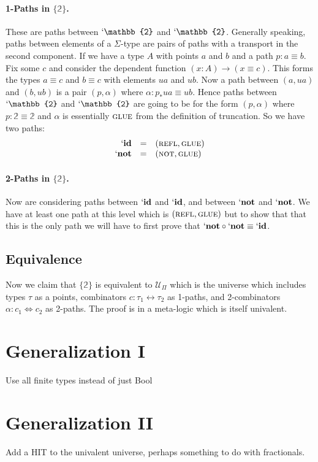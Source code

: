 \documentclass{entcs}
\newcommand{\reflp}{\textsc{refl}}
\newcommand{\notp}{\textsc{not}}
\newcommand{\gluep}{\textsc{glue}}
\newcommand{\iso}{\leftrightarrow}
\newcommand{\isotwo}{\Leftrightarrow}
\newcommand{\bt}{\mathbb{2}}
\begin{document}
\paragraph*{1-Paths in $\{\bt\}$.} These are paths between $`\bt$ and
$`\bt$. Generally speaking, paths between elements of a $\Sigma$-type are pairs
of paths with a transport in the second component. If we have a type $A$ with
points $a$ and $b$ and a path $p : a \equiv b$. Fix some $c$ and consider the
dependent function $(x:A) \rightarrow (x \equiv c)$. This forms the types
$a\equiv c$ and $b\equiv c$ with elements $ua$ and $ub$. Now a path between
$(a,ua)$ and $(b,ub)$ is a pair $(p,\alpha)$ where $\alpha : p_* ua \equiv
ub$. Hence paths between $`\bt$ and $`\bt$ are going to be for the form
$(p,\alpha)$ where $p : \bt \equiv \bt$ and $\alpha$ is essentially $\gluep$
from the definition of truncation. So we have two paths:
\[\begin{array}{rcl}
`\mathbf{id} &=& (\reflp,\gluep) \\
`\mathbf{not} &=& (\notp,\gluep)
\end{array}\]

\paragraph*{2-Paths in $\{\bt\}$.} Now are considering paths between
$`\mathbf{id}$ and $`\mathbf{id}$, and between $`\mathbf{not}$ and
$`\mathbf{not}$. We have at least one path at this level which is
$(\reflp,\gluep)$ but to show that that this is the only path we will have to
first prove that $`\mathbf{not} \circ `\mathbf{not} \equiv `\mathbf{id}$.



\subsection{Equivalence}

Now we claim that $\{\bt\}$ is equivalent to $\mathcal{U}_\Pi$ which is the
universe which includes types $\tau$ as a points, combinators
$c : \tau_1 \iso \tau_2$ as 1-paths, and 2-combinators
$\alpha : c_1 \isotwo c_2$ as 2-paths. The proof is in a meta-logic which is
itself univalent.

\section{Generalization I}

Use all finite types instead of just Bool

\section{Generalization II}

Add a HIT to the univalent universe, perhaps something to do with fractionals.


{\footnotesize

}
\end{document}
